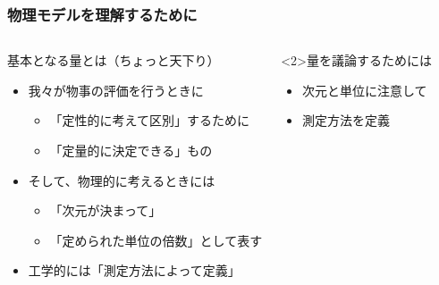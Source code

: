 \documentclass[unicode,12pt,aspectratio=169]{beamer}
\begin{document}
\begin{frame}
	\frametitle{物理モデルを理解するために}
	\begin{columns}[c, onlytextwidth]
			\begin{block}{基本となる量とは（ちょっと天下り）}
		\begin{itemize}
			\item 我々が物事の評価を行うときに
			\begin{itemize}
				\item 「定性的に考えて区別」するために
				\item 「定量的に決定できる」もの
			\end{itemize}
			\item そして、物理的に考えるときには
			\begin{itemize}
				\item 「\alert{次元}が決まって」
				\item 「定められた\alert{単位の倍数}」として表す
			\end{itemize}
			\item 工学的には「測定方法によって定義」
		\end{itemize}
	\end{block}
			\begin{alertblock}<2>{量を議論するためには}
        \begin{itemize}
            \item 次元と単位に注意して
            \item 測定方法を定義
        \end{itemize}
    \end{alertblock}
	\end{columns}

\end{frame}
\end{document}
